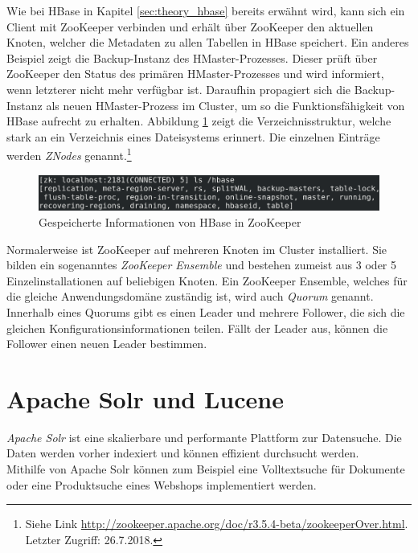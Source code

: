 \noindent
Wie bei HBase in Kapitel \ref{sec:theory_hbase} bereits erwähnt wird, kann sich ein Client mit ZooKeeper verbinden und erhält über ZooKeeper den aktuellen Knoten, welcher die Metadaten zu allen Tabellen in HBase speichert. Ein anderes Beispiel zeigt die Backup-Instanz des HMaster-Prozesses.
Dieser prüft über ZooKeeper den Status des primären HMaster-Prozesses und wird informiert, wenn letzterer nicht mehr verfügbar ist. Daraufhin propagiert sich die Backup-Instanz als neuen HMaster-Prozess im Cluster, um so die Funktionsfähigkeit von HBase aufrecht zu erhalten. Abbildung \ref{fig:zookeeper_dir} zeigt die Verzeichnisstruktur, welche stark an ein Verzeichnis eines Dateisystems erinnert. Die einzelnen Einträge werden \textit{ZNodes} genannt.\footnote{Siehe Link \url{http://zookeeper.apache.org/doc/r3.5.4-beta/zookeeperOver.html}. Letzter Zugriff: 26.7.2018.} \\

\begin{figure}[ht]
  \centering
  \includegraphics[width=\textwidth]{./resource/zookeeper_dir.png}
  \caption{Gespeicherte Informationen von HBase in ZooKeeper}
  \label{fig:zookeeper_dir}
\end{figure}


\noindent
Normalerweise ist ZooKeeper auf mehreren Knoten im Cluster installiert. Sie bilden ein sogenanntes \textit{ZooKeeper Ensemble} und bestehen zumeist aus 3 oder 5 Einzelinstallationen auf beliebigen Knoten. Ein ZooKeeper Ensemble, welches für die gleiche Anwendungsdomäne zuständig ist, wird auch \textit{Quorum} genannt. Innerhalb eines Quorums gibt es einen Leader und mehrere Follower, die sich die gleichen Konfigurationsinformationen teilen. Fällt der Leader aus, können die Follower einen neuen Leader bestimmen.\cite{zookeeper_essentials}\\

\section{Apache Solr und Lucene}
\label{sec:theory_solr}
\textit{Apache Solr\texttrademark\thinspace} ist eine skalierbare und performante Plattform zur Datensuche. Die Daten werden vorher indexiert und können effizient durchsucht werden.\cite{solr_search}\\
Mithilfe von Apache Solr können zum Beispiel eine Volltextsuche für Dokumente oder eine Produktsuche eines Webshops implementiert werden.

